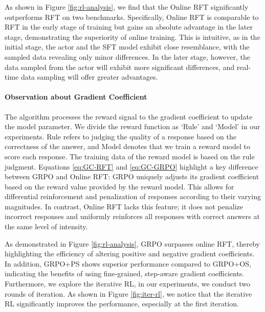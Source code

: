 As shown in Figure \ref{fig:rl-analysis},
we find that the Online RFT significantly outperforms RFT on two benchmarks. Specifically, Online RFT is comparable to RFT in the early stage of training but gains an absolute advantage in the later stage, demonstrating the superiority of online training. This is intuitive, as in the initial stage, the actor and the SFT model exhibit close resemblance, with the sampled data revealing only minor differences. In the later stage, however, the data sampled from the actor will exhibit more significant differences, and real-time data sampling will offer greater advantages.

\paragraph{Observation about Gradient Coefficient} The algorithm processes the reward signal to the gradient coefficient to update the model parameter. We divide the reward function as `Rule' and `Model' in our experiments. Rule refers to judging the quality of a response based on the correctness of the answer, and Model denotes that we train a reward model to score each response. The training data of the reward model is based on the rule judgment. Equations \ref{eq:GC-RFT} and \ref{eq:GC-GRPO} highlight a key difference between GRPO and Online RFT: GRPO uniquely adjusts its gradient coefficient based on the reward value provided by the reward model. This allows for differential reinforcement and penalization of responses according to their varying magnitudes. In contrast, Online RFT lacks this feature; it does not penalize incorrect responses and uniformly reinforces all responses with correct answers at the same level of intensity. 

As demonstrated in Figure \ref{fig:rl-analysis}, GRPO surpasses online RFT, thereby highlighting the efficiency of altering positive and negative gradient coefficients. In addition, GRPO+PS shows superior performance compared to GRPO+OS, indicating the benefits of using fine-grained, step-aware gradient coefficients. Furthermore, we explore the iterative RL, in our experiments, we conduct two rounds of iteration. As shown in Figure \ref{fig:iter-rl}, we notice that the iterative RL significantly improves the performance, especially at the first iteration.

